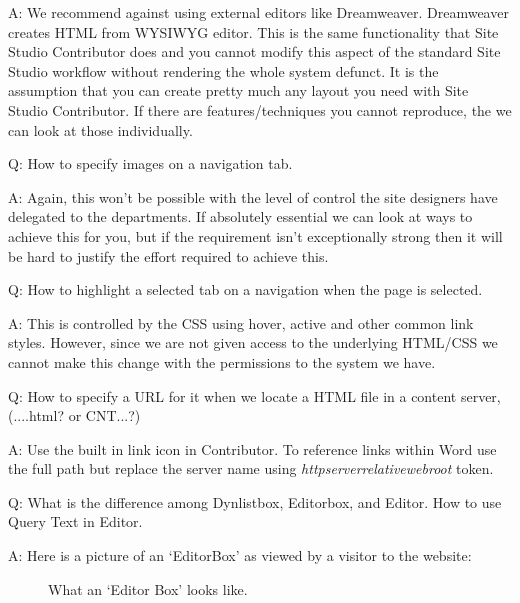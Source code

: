 A: We recommend against using external editors like Dreamweaver.
Dreamweaver creates HTML from WYSIWYG editor.  This is the same
functionality that Site Studio Contributor does and you cannot modify
this aspect of the standard Site Studio workflow without rendering the
whole system defunct.  It is the assumption that you can create pretty
much any layout you need with Site Studio Contributor.  If there are
features/techniques you cannot reproduce, the we can look at those
individually.

Q: How to specify images on a navigation tab.

A: Again, this won't be possible with the level of control the site
designers have delegated to the departments. If absolutely essential
we can look at ways to achieve this for you, but if the requirement
isn't exceptionally strong then it will be hard to justify the effort
required to achieve this.

Q: How to highlight a selected tab on a navigation when the page is
selected.

A: This is controlled by the CSS using hover, active and other common
link styles.  However, since we are not given access to the underlying
HTML/CSS we cannot make this change with the permissions to the system
we have.

Q: How to specify a URL for it when we locate a HTML file in a content
server, (....html? or CNT...?)

A: Use the built in link icon in Contributor.  To reference links
within Word use the full path but replace the server name using
\emph{httpserverrelativewebroot} token.

Q: What is the difference among Dynlistbox, Editorbox, and Editor. How
to use Query Text in Editor.

A: Here is a picture of an `EditorBox' as viewed by a visitor to the website:

\begin{figure}[h!]
  \centering
  \caption{What an `Editor Box' looks like.}
\end{figure}

